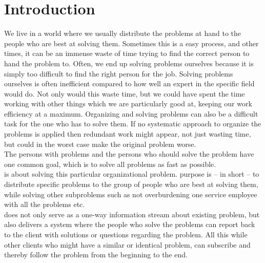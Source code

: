 \chapter{Introduction}
\label{sec:introduction}





We live in a world where we usually distribute the problems at hand to the people who are best at solving them. Sometimes this is a easy process, and other times, it can be an immense waste of time trying to find the correct person to hand the problem to. Often, we end up solving problems ourselves because it is simply too difficult to find the right person for the job. Solving problems ourselves is often inefficient compared to how well an expert in the specific field would do. Not only would this waste time, but we could have spent the time working with other things which we are particularly good at, keeping our work efficiency at a maximum.
Organizing and solving problems can also be a difficult task for the one who has to solve them. If no systematic approach to organize the problems is applied then redundant work might appear, not just wasting time, but could in the worst case make the original problem worse.\\
The persons with problems and the persons who should solve the problem have one common goal, which is to solve all problems as fast as possible.\\


\hdesk{} is about solving this particular organizational problem. \hdesk{} purpose is -- in short -- to distribute specific problems to the group of people who are best at solving them, while solving other subproblems such as not overburdening one service employee with all the problems etc.\\
\hdesk{} does not only serve as a one-way information stream about existing problem, but also delivers a system where the people who solve the problems can report back to the client with solutions or questions regarding the problem. All this while other clients who might have a similar or identical problem, can subscribe and thereby follow the problem from the beginning to the end.\\

